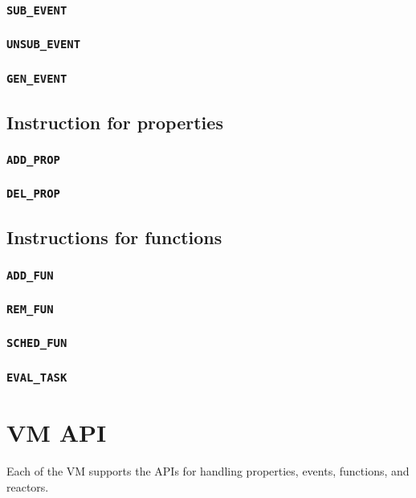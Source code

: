 \documentclass{note}
\newcommand{\rtt}[1]{\textcolor{red2}{\texttt{#1}}}
\begin{document}
\subsubsection{\rtt{SUB\_EVENT}}
\subsubsection{\rtt{UNSUB\_EVENT}}
\subsubsection{\rtt{GEN\_EVENT}}

\subsection{Instruction for properties}
\subsubsection{\rtt{ADD\_PROP}}
\subsubsection{\rtt{DEL\_PROP}}

\subsection{Instructions for functions}
\subsubsection{\rtt{ADD\_FUN}}
\subsubsection{\rtt{REM\_FUN}}
\subsubsection{\rtt{SCHED\_FUN}}
\subsubsection{\rtt{EVAL\_TASK}}



\section{VM API}
\noindent{}Each of the VM supports the APIs for handling properties, events,
functions, and reactors.
\end{document}
